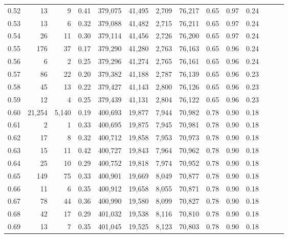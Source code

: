 \begin{tabular}{rrrrrrrrrrrrrr}
0.52 &      13 &       9 &  0.41 &  379,075 &   41,495 &   2,709 &  76,217 &  0.65 &  0.97 &      0.24 \\
0.53 &      13 &       6 &  0.32 &  379,088 &   41,482 &   2,715 &  76,211 &  0.65 &  0.97 &      0.24 \\
0.54 &      26 &      11 &  0.30 &  379,114 &   41,456 &   2,726 &  76,200 &  0.65 &  0.97 &      0.24 \\
0.55 &     176 &      37 &  0.17 &  379,290 &   41,280 &   2,763 &  76,163 &  0.65 &  0.96 &      0.24 \\
0.56 &       6 &       2 &  0.25 &  379,296 &   41,274 &   2,765 &  76,161 &  0.65 &  0.96 &      0.24 \\
0.57 &      86 &      22 &  0.20 &  379,382 &   41,188 &   2,787 &  76,139 &  0.65 &  0.96 &      0.23 \\
0.58 &      45 &      13 &  0.22 &  379,427 &   41,143 &   2,800 &  76,126 &  0.65 &  0.96 &      0.23 \\
0.59 &      12 &       4 &  0.25 &  379,439 &   41,131 &   2,804 &  76,122 &  0.65 &  0.96 &      0.23 \\
0.60 &  21,254 &   5,140 &  0.19 &  400,693 &   19,877 &   7,944 &  70,982 &  0.78 &  0.90 &      0.18 \\
0.61 &       2 &       1 &  0.33 &  400,695 &   19,875 &   7,945 &  70,981 &  0.78 &  0.90 &      0.18 \\
0.62 &      17 &       8 &  0.32 &  400,712 &   19,858 &   7,953 &  70,973 &  0.78 &  0.90 &      0.18 \\
0.63 &      15 &      11 &  0.42 &  400,727 &   19,843 &   7,964 &  70,962 &  0.78 &  0.90 &      0.18 \\
0.64 &      25 &      10 &  0.29 &  400,752 &   19,818 &   7,974 &  70,952 &  0.78 &  0.90 &      0.18 \\
0.65 &     149 &      75 &  0.33 &  400,901 &   19,669 &   8,049 &  70,877 &  0.78 &  0.90 &      0.18 \\
0.66 &      11 &       6 &  0.35 &  400,912 &   19,658 &   8,055 &  70,871 &  0.78 &  0.90 &      0.18 \\
0.67 &      78 &      44 &  0.36 &  400,990 &   19,580 &   8,099 &  70,827 &  0.78 &  0.90 &      0.18 \\
0.68 &      42 &      17 &  0.29 &  401,032 &   19,538 &   8,116 &  70,810 &  0.78 &  0.90 &      0.18 \\
0.69 &      13 &       7 &  0.35 &  401,045 &   19,525 &   8,123 &  70,803 &  0.78 &  0.90 &      0.18 \\

\end{tabular}
